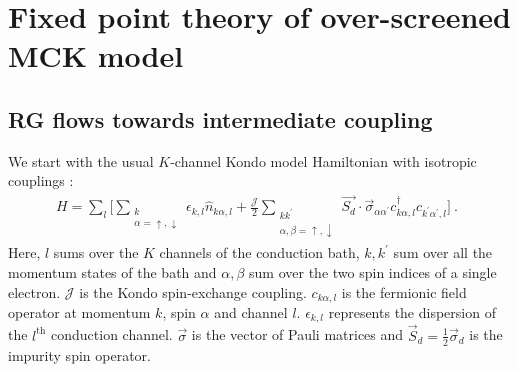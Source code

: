 \documentclass[reprint,prb,superscriptaddress]{revtex4-1}
\begin{document}
\section{Fixed point theory of over-screened MCK model}

\subsection{RG flows towards intermediate coupling}
\label{rg_flow_section}
We start with the usual \(K\)-channel Kondo model Hamiltonian with isotropic couplings \cite{Noz_blandin_1980}:
\begin{gather}
	\label{mc_ham}
	H = \sum_l\bigg[\sum_{\substack{k\\\alpha=\uparrow,\downarrow}}\epsilon_{k,l} \hat n_{k\alpha,l} + \frac{\mathcal{J}}{2}\sum_{\substack{kk^\prime\\\alpha,\beta= \uparrow,\downarrow}} \vec{S_d}\cdot\vec{\sigma}_{\alpha\alpha^\prime}c_{k\alpha,l}^\dagger c_{k^\prime\alpha^\prime, l}\bigg]~.~~
\end{gather}
Here, \(l\) sums over the \(K\) channels of the conduction bath, \(k,k^\prime\) sum over all the momentum states of the bath and \(\alpha,\beta\) sum over the two spin indices of a single electron. \(\mathcal{J}\) is the Kondo spin-exchange coupling. \(c_{k\alpha,l}\) is the fermionic field operator at momentum \(k\), spin \(\alpha\) and channel \(l\). \(\epsilon_{k,l}\) represents the dispersion of the \(l^\text{th}\) conduction channel. \(\vec \sigma\) is the vector of Pauli matrices and \(\vec S_d = \frac{1}{2}\vec \sigma_d\) is the impurity spin operator.
\end{document}
